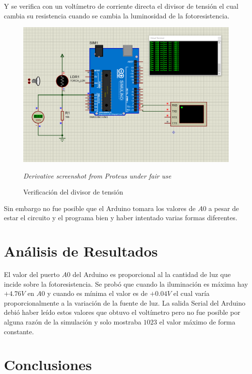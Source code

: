 \documentclass{article}
\begin{document}
Y se verifica con un voltímetro de corriente directa el divisor de tensión el cual cambia su resistencia cuando se cambia la luminosidad de la fotoresistencia.

\begin{figure}[H]
\centering
\includegraphics[width=0.3\paperwidth]{images/sim-2.png}
\caption{Verificación del divisor de tensión}\footnotesize
\textit{Derivative screenshot from Proteus under fair use}
\end{figure}

Sin embargo no fue posible que el Arduino tomara los valores de $A0$ a pesar de estar el circuito y el programa bien y haber intentado varias formas diferentes.

\section{Análisis de Resultados}

El valor del puerto $A0$ del Arduino es proporcional al la cantidad de luz que incide sobre la fotoresistencia. Se probó que cuando la iluminación es máxima hay $+4.76V$ en $A0$ y cuando es mínima el valor es de $+0.04V$ el cual varía proporcionalmente a la variación de la fuente de luz. La salida Serial del Arduino debió haber leído estos valores que obtuvo el voltímetro pero no fue posible por alguna razón de la simulación y solo mostraba $1023$ el valor máximo de forma constante.

\section{Conclusiones}



\printbibliography
\end{document}
